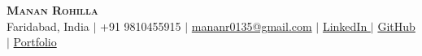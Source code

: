 \begin{center}
  \textbf{\Huge \scshape Manan Rohilla} \\ \vspace{1pt}
  Faridabad, India $|$ +91 9810455915 $|$
  \href{mailto:mananr0135@gmail.com}{mananr0135@gmail.com} $|$
  \href{https://www.linkedin.com/in/manan-rohilla-074855175/}{LinkedIn \faLinkedin} $|$
  \href{https://github.com/MananRohilla}{GitHub \faGithub} $|$
  \href{https://manan-portfolio-delta.vercel.app/}{Portfolio \faGlobe}
\end{center}
